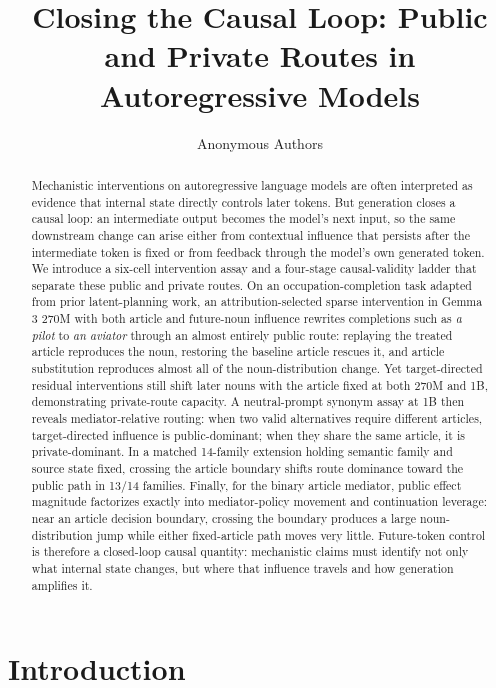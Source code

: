 \documentclass[
]{article}
\title{Closing the Causal Loop: Public and Private Routes in
Autoregressive Models}
\author{Anonymous Authors}
\date{}
\begin{document}
\maketitle
\begin{abstract}
Mechanistic interventions on autoregressive language models are often
interpreted as evidence that internal state directly controls later
tokens. But generation closes a causal loop: an intermediate output
becomes the model's next input, so the same downstream change can arise
either from contextual influence that persists after the intermediate
token is fixed or from feedback through the model's own generated token.
We introduce a six-cell intervention assay and a four-stage
causal-validity ladder that separate these public and private routes. On
an occupation-completion task adapted from prior latent-planning work,
an attribution-selected sparse intervention in Gemma 3 270M with both
article and future-noun influence rewrites completions such as \emph{a
pilot} to \emph{an aviator} through an almost entirely public route:
replaying the treated article reproduces the noun, restoring the
baseline article rescues it, and article substitution reproduces almost
all of the noun-distribution change. Yet target-directed residual
interventions still shift later nouns with the article fixed at both
270M and 1B, demonstrating private-route capacity. A neutral-prompt
synonym assay at 1B then reveals mediator-relative routing: when two
valid alternatives require different articles, target-directed influence
is public-dominant; when they share the same article, it is
private-dominant. In a matched 14-family extension holding semantic
family and source state fixed, crossing the article boundary shifts
route dominance toward the public path in 13/14 families. Finally, for
the binary article mediator, public effect magnitude factorizes exactly
into mediator-policy movement and continuation leverage: near an article
decision boundary, crossing the boundary produces a large
noun-distribution jump while either fixed-article path moves very
little. Future-token control is therefore a closed-loop causal quantity:
mechanistic claims must identify not only what internal state changes,
but where that influence travels and how generation amplifies it.
\end{abstract}


\section{Introduction}\label{introduction}
\end{document}
